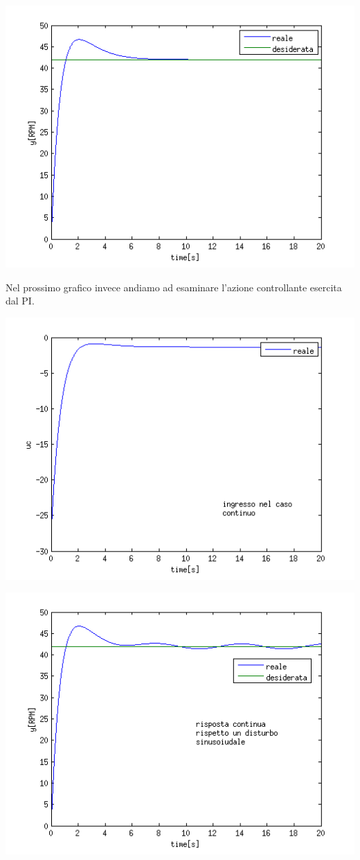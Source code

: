 \documentclass[a4paper,13pt]{article}
\begin{document}
\begin{center}
\includegraphics[scale=0.6]{graph/ycont.png}
\end{center}
Nel prossimo grafico invece andiamo ad esaminare l'azione controllante esercita dal PI. 
\begin{center}
\includegraphics[scale=0.6]{graph/ucont.png}
\end{center}
\begin{center}
\includegraphics[scale=0.6]{graph/ycontsin.png}
\end{center}
\end{document}
